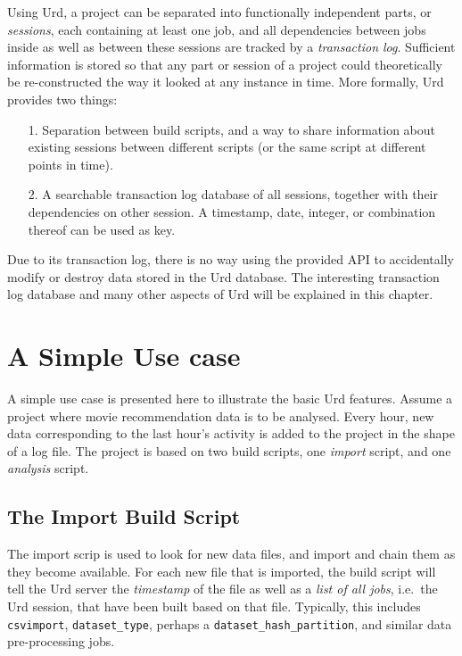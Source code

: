 Using Urd, a project can be separated into functionally independent
parts, or \textsl{sessions}, each containing at least one job, and all
dependencies between jobs inside as well as between these sessions are
tracked by a \textsl{transaction log}.  Sufficient information is
stored so that any part or session of a project could theoretically be
re-constructed the way it looked at any instance in time.  More
formally, Urd provides two things:
\begin{itemize}
\item[1.] Separation between build scripts,
          and a way to share information about existing sessions
          between different scripts (or the same script at different
          points in time).
\item[2.] A searchable transaction log database of all sessions,
          together with their dependencies on other session.  A
          timestamp, date, integer, or combination thereof can be used
          as key.
\end{itemize}
Due to its transaction log, there is no way using the provided API to
accidentally modify or destroy data stored in the Urd database.  The
interesting transaction log database and many other aspects of Urd
will be explained in this chapter.





\section{A Simple Use case}

A simple use case is presented here to illustrate the basic Urd
features.  Assume a project where movie recommendation data is to be
analysed.  Every hour, new data corresponding to the last hour's
activity is added to the project in the shape of a log file.  The
project is based on two build scripts, one \textsl{import} script, and
one \textsl{analysis} script.

\subsection{The Import Build Script}
The import scrip is used to look for new data files, and import and
chain them as they become available.  For each new file that is
imported, the build script will tell the Urd server
the \textsl{timestamp} of the file as well as a \textsl{list of all
jobs}, i.e.\ the Urd session, that have been built based on that file.
Typically, this includes \texttt{csvimport}, \texttt{dataset\_type},
perhaps a \texttt{dataset\_hash\_partition}, and similar data
pre-processing jobs.



